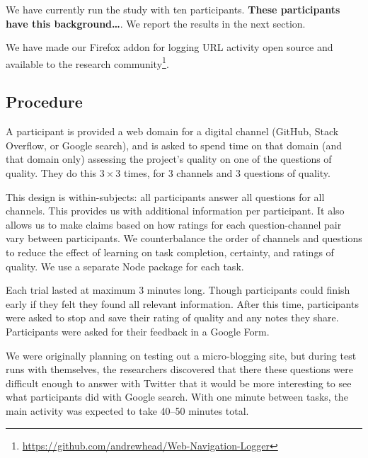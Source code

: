 We have currently run the study with ten participants.
\textbf{These participants have this background\ldots{}}.
We report the results in the next section.

We have made our Firefox addon for logging URL activity open source and available to the research community\footnote{\url{https://github.com/andrewhead/Web-Navigation-Logger}}.


\fi

\subsection{Procedure}

A participant is provided a web domain for a digital channel (GitHub, Stack Overflow, or Google search), and is asked to spend time on that domain (and that domain only) assessing the project's quality on one of the questions of quality.
They do this $3\times3$ times, for 3 channels and 3 questions of quality.

This design is within-subjects: all participants answer all questions for all channels.
This provides us with additional information per participant.
It also allows us to make claims based on how ratings for each question-channel pair vary between participants.
We counterbalance the order of channels and questions to reduce the effect of learning on task completion, certainty, and ratings of quality.
We use a separate Node package for each task.

Each trial lasted at maximum 3 minutes long.
Though participants could finish early if they felt they found all relevant information.
After this time, participants were asked to stop and save their rating of quality and any notes they share.
Participants were asked for their feedback in a Google Form.

We were originally planning on testing out a micro-blogging site, but during test runs with themselves, the researchers discovered that there these questions were difficult enough to answer with Twitter that it would be more interesting to see what participants did with Google search.
With one minute between tasks, the main activity was expected to take 40--50 minutes total.

